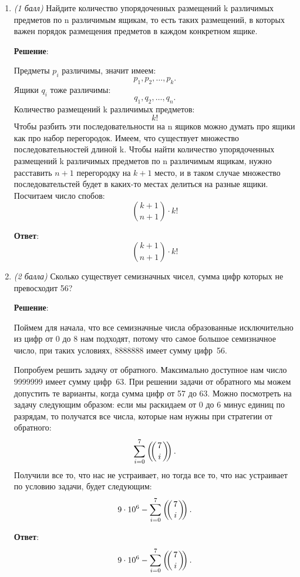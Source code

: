 \documentclass{article}
\def\multiset#1#2{\ensuremath{\left(\kern-.3em\left(\genfrac{}{}{0pt}{}{#1}{#2}\right)\kern-.3em\right)}}
\begin{document}
\begin{enumerate}
\begin{itemize}
    \end{itemize}
  \item \textit{(1 балл)} Найдите количество упорядоченных размещений k различимых предметов по n различимым ящикам, то есть таких размещений, в которых важен порядок размещения предметов в каждом конкретном ящике.
    
    \textbf{Решение}:

    Предметы $p_i$ различимы, значит имеем:
    \begin{equation}
      p_1, p_2, \ldots, p_k.
    \end{equation}
    Ящики $q_i$ тоже различимы:
    \begin{equation}
      q_1, q_2, \ldots, q_n.
    \end{equation}
    Количество размещений k различимых предметов:
    \begin{equation}
      k!
    \end{equation}
    Чтобы разбить эти последовательности на n ящиков можно думать про ящики как про набор перегородок. Имеем, что существует множество последовательностей длиной k. Чтобы найти количество упорядоченных размещений k различимых предметов по n различимым ящикам, нужно расставить $n + 1$ перегородку на $k + 1$ место, и в таком случае множество последовательстей будет в каких-то местах делиться на разные ящики. Посчитаем число спобов:
    \begin{equation}
      \binom{k + 1}{n + 1} \cdot k!
    \end{equation}

    \textbf{Ответ}:
    $$\binom{k + 1}{n + 1} \cdot k!$$

  \item \textit{(2 балла)} Сколько существует семизначных чисел, сумма цифр которых не превосходит 56?
  
    \textbf{Решение}:

    Поймем для начала, что все семизначные числа образованные исключительно из цифр от 0 до 8 нам подходят, потому что самое большое семизначное число, при таких условиях, 8888888 имеет сумму цифр~56.
    
    Попробуем решить задачу от обратного. Максимально доступное нам число 9999999 имеет сумму цифр~63. При решении задачи от обратного мы можем допустить те варианты, когда сумма цифр от 57 до 63. Можно посмотреть на задачу следующим образом: если мы раскидаем от 0 до 6 минус единиц по разрядам, то получатся все числа, которые нам нужны при стратегии от обратного:
    \begin{equation}
      \sum_{i = 0}^{7} \multiset{7}{i}.
    \end{equation}
    Получили все то, что нас не устраивает, но тогда все то, что нас устраивает по условию задачи, будет следующим:
    \begin{equation}
      9 \cdot 10^6 - \sum_{i = 0}^{7} \multiset{7}{i}.
    \end{equation}

    \textbf{Ответ}:
    $$9 \cdot 10^6 - \sum_{i = 0}^{7} \multiset{7}{i}.$$
  \end{enumerate}
\end{document}
